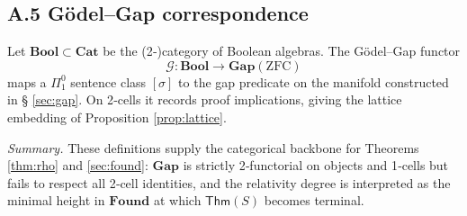\documentclass[11pt]{article}
\theoremstyle{definition}\newtheorem{definition}[theorem]{Definition}
\theoremstyle{remark}\newtheorem{remark}[theorem]{Remark}
\newcommand{\Found}{\mathbf{Found}}
\newcommand{\Gap}{\mathbf{Gap}}
\begin{document}
\subsection*{A.5 Gödel–Gap correspondence}
Let \(\mathbf{Bool}\subset\mathbf{Cat}\) be the (2‑)category of Boolean
algebras.  The Gödel–Gap functor
\[
  \mathcal G:\mathbf{Bool}\longrightarrow\Gap(\mathrm{ZFC})
\]
maps a $\Pi^0_1$ sentence class $[\sigma]$ to the gap predicate on the
manifold constructed in § \ref{sec:gap}.  On 2‑cells it records proof
implications, giving the lattice embedding of
Proposition \ref{prop:lattice}.

\vspace{0.5em}
\noindent
\emph{Summary.}  These definitions supply the categorical backbone for
Theorems \ref{thm:rho} and \ref{sec:found}: $\Gap$ is strictly
2‑functorial on objects and 1‑cells but fails to respect all 2‑cell
identities, and the relativity degree is interpreted as the minimal
height in \(\Found\) at which $\mathsf{Thm}(S)$ becomes terminal.
\end{document}
